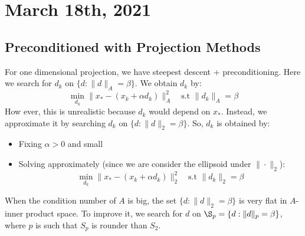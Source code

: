 \documentclass[../main/main.tex]{subfiles}
\begin{document}
\section{March 18th, 2021}
\subsection{Preconditioned with Projection Methods}
For one dimensional projection, we have steepest descent + preconditioning. Here we search for $d_{k}$ on $\{ d : \|d\|_{A} = \beta \}$. We obtain $d_{k}$ by: \[
\min _{d_{k}} \|x_{*}-(x_{k}+\alpha d_{k})\|^2_{A} \quad \text{s.t } \|d_{k}\|_{A} = \beta
\] How ever, this is unrealistic because $d_{k}$ would depend on $x_{*}$. Instead, we approximate it by searching $d_{k}$ on $ \{d: \|d\|_{2} =\beta \}$. So, $d_k$ is obtained by:
\begin{itemize}
  \item Fixing $\alpha  > 0$ and small
  \item Solving approximately (since we are consider the ellipsoid under $\|\cdot \|_{2}$): \[
\min _{d_{k}} \|x_{*}-(x_{k}+\alpha d_{k})\|^2_{2} \quad \text{s.t } \|d_{k}\|_{2} = \beta
        \]
\end{itemize}
When the condition number of $A$ is big, the set $\{d : \|d\|_{2} = \beta \}$ is very flat in $A$-inner product space. To improve it, we search for $d$ on $\S_{p}=\{ d : \|d\|_{p} = \beta \}$, where $p$ is such that $S_{p}$ is rounder than $S_{2}$.
\end{document}
